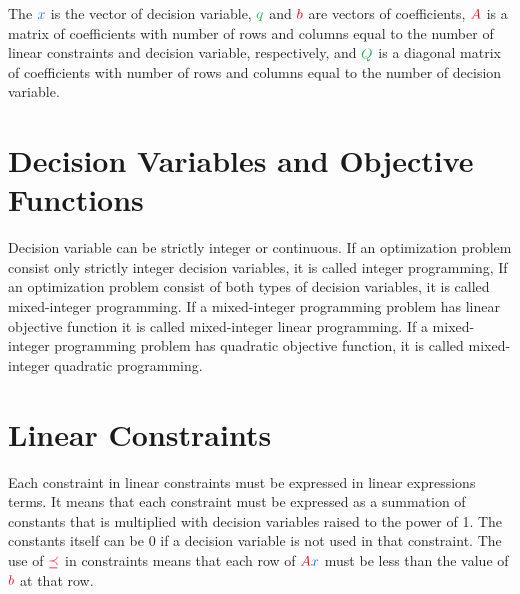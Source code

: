 \documentclass{article}
\begin{document}
The $\color{var} x$ is the vector of \textcolor{var}{decision variable}, $\color{obj} q$ and $\color{const} b$ are vectors of coefficients, $\color{const} A$ is a matrix of coefficients with number of rows and columns equal to the number of \textcolor{const}{linear constraints} and \textcolor{var}{decision variable}, respectively, and $\color{obj} Q$ is a diagonal matrix of coefficients with number of rows and columns equal to the number of \textcolor{var}{decision variable}.

\section{Decision Variables and Objective Functions}

\textcolor{var}{Decision variable} can be strictly integer or continuous. If an optimization problem consist only strictly integer \textcolor{var}{decision variables}, it is called \textcolor{var}{integer} programming, If an optimization problem consist of both types of \textcolor{var}{decision variables}, it is called \textcolor{var}{mixed-integer} programming. If a \textcolor{var}{mixed-integer} programming problem has \textcolor{obj}{linear objective function} it is called \textcolor{var}{mixed-integer} \textcolor{obj}{linear} programming. If a \textcolor{var}{mixed-integer} programming problem has \textcolor{obj}{quadratic objective function}, it is called \textcolor{var}{mixed-integer} \textcolor{obj}{quadratic} programming.

\section{Linear Constraints}

Each \textcolor{const}{constraint} in \textcolor{const}{linear constraints} must be expressed in linear expressions terms. It means that each \textcolor{const}{constraint} must be expressed as a summation of \textcolor{const}{constants} that is multiplied with \textcolor{var}{decision variables} raised to the power of 1. The \textcolor{const}{constants} itself can be $0$ if a \textcolor{var}{decision variable} is not used in that \textcolor{const}{constraint}. The use of $\color{const} \preceq$ in \textcolor{const}{constraints} means that each row of $\color{const} A \color{var} x$ must be less than the value of $\color{const} b$ at that row.
\end{document}
